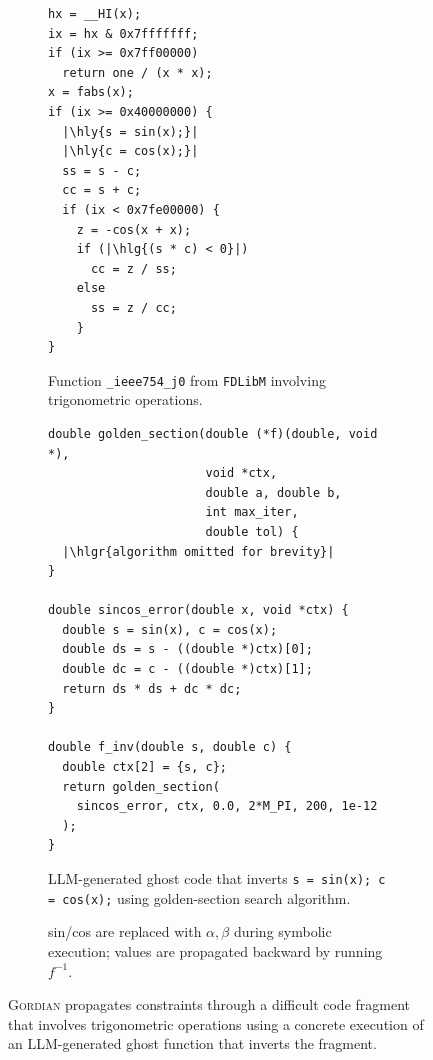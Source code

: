 \documentclass[acmsmall,screen,nonacm]{acmart}
\newcommand{\projName}{\textsc{Gordian}\xspace}
\theoremstyle{definition}
\begin{document}
\begin{figure}
  \centering
  \begin{subfigure}[b]{0.24\textwidth}
    \centering
{
\scriptsize          
\begin{verbatim}
hx = __HI(x);
ix = hx & 0x7fffffff;
if (ix >= 0x7ff00000)
  return one / (x * x);
x = fabs(x);
if (ix >= 0x40000000) {
  |\hly{s = sin(x);}|
  |\hly{c = cos(x);}|
  ss = s - c;
  cc = s + c;
  if (ix < 0x7fe00000) {
    z = -cos(x + x);
    if (|\hlg{(s * c) < 0}|)
      cc = z / ss;
    else
      ss = z / cc;
    }
}
\end{verbatim}
}
    \caption{Function \texttt{\_ieee754\_j0} from \texttt{FDLibM} involving trigonometric operations.}
    \label{fig:ieee754}
  \end{subfigure}
  \hfill
  \begin{subfigure}[b]{0.36\textwidth}
    \centering
{
\tiny          
\begin{verbatim}
double golden_section(double (*f)(double, void *),
                      void *ctx,
                      double a, double b,
                      int max_iter,
                      double tol) {
  |\hlgr{algorithm omitted for brevity}|
}
                      
double sincos_error(double x, void *ctx) {
  double s = sin(x), c = cos(x);
  double ds = s - ((double *)ctx)[0];
  double dc = c - ((double *)ctx)[1];
  return ds * ds + dc * dc;
}

double f_inv(double s, double c) {
  double ctx[2] = {s, c};
  return golden_section(
    sincos_error, ctx, 0.0, 2*M_PI, 200, 1e-12
  );
}
\end{verbatim}
}
    \caption{LLM-generated ghost code that inverts \texttt{s = sin(x); c = cos(x);} using golden-section search algorithm.}
    \label{fig:inversion}
  \end{subfigure}
  \hfill
  \begin{subfigure}[b]{0.35\textwidth}
    \centering 
    \vspace{2mm}
    \caption{sin/cos are replaced with $\alpha, \beta$ during symbolic execution; values are propagated backward by running $f^{-1}$.}
    \label{fig:propagation}
  \end{subfigure}
  \vspace{-2mm}
  \caption{\projName propagates constraints through a difficult code fragment that involves trigonometric operations using a concrete execution of an LLM-generated ghost function that inverts the fragment.}
  \label{fig:complex_math_example}
  \vspace{-2mm}
\end{figure}
\end{document}
